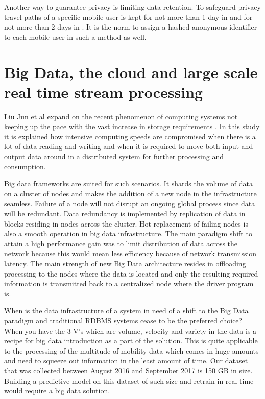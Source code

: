 \documentclass[12pt, a4paper]{report}
\theoremstyle{definition}
\theoremstyle{definition}%
\theoremstyle{definition}%
\theoremstyle{definition}%
\theoremstyle{definition}%
\theoremstyle{definition}%
\begin{document}
Another way to guarantee privacy is limiting data retention. To safeguard privacy travel paths of a specific mobile user is kept for not more than 1 day in \cite{Hoteit2014} and for not more than 2 days in \cite{Calabrese2013}. It is the norm to assign a hashed anonymous identifier to each mobile user in such a method as well.


\section{Big Data, the cloud and large scale real time stream processing} \label{background_big_data}

Liu Jun et al expand on the recent phenomenon of computing systems not keeping up the pace with the vast increase in storage requirements \cite{Liu2014}. In this study it is explained how intensive computing speeds are compromised when there is a lot of data reading and writing and when it is required to move both input and output data around in a distributed system for further processing and consumption. 

Big data frameworks are suited for such scenarios. It shards the volume of data on a cluster of nodes and makes the addition of a new node in the infrastructure seamless. Failure of a node will not disrupt an ongoing global process since data will be redundant. Data redundancy is implemented by replication of data in blocks residing in nodes across the cluster. Hot replacement of failing nodes is also a smooth operation in big data infrastructure. The main paradigm shift to attain a high performance gain was to limit distribution of data across the network because this would mean less efficiency because of network transmission latency. The main strength of new Big Data architecture resides in offloading processing to the nodes where the data is located and only the resulting required information is transmitted back to a centralized node where the driver program is\cite{inoubli2016experimental}.

When is the data infrastructure of a system in need of a shift to the Big Data paradigm and traditional RDBMS systems cease to be the preferred choice? When you have the 3 V's which are volume, velocity and variety in the data is a recipe for big data introduction as a part of the solution. This is quite applicable to the processing of the multitude of mobility data which comes in huge amounts and need to squeeze out information in the least amount of time. Our dataset that was collected between August 2016 and September 2017 is 150 GB in size. Building a predictive model on this dataset of such size and retrain in real-time would require a big data solution. 
\end{document}
